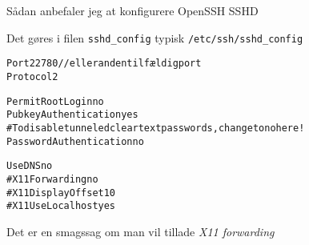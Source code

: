 \documentclass[Screen16to9,17pt]{foils}
\begin{document}

\begin{list1}
\item Sådan anbefaler jeg at konfigurere OpenSSH SSHD
\item Det gøres i filen \verb+sshd_config+ typisk \verb+/etc/ssh/sshd_config+
\end{list1}

\begin{alltt}\small
Port 22780    // eller anden tilfældig port
Protocol 2

PermitRootLogin no
PubkeyAuthentication yes
# To disable tunneled clear text passwords, change to no here!
PasswordAuthentication no

UseDNS no
#X11Forwarding no
#X11DisplayOffset 10
#X11UseLocalhost yes
\end{alltt}

Det er en smagssag om man vil tillade \emph{X11 forwarding}



\slidenext
\end{document}
